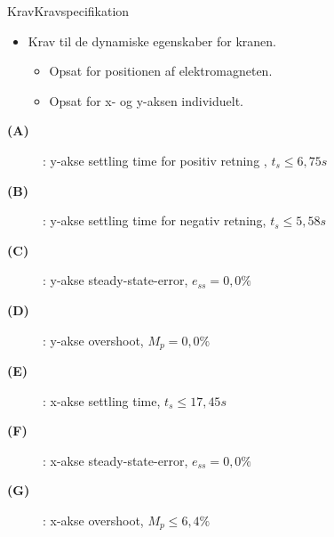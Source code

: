 \begin{frame}{Krav}{Kravspecifikation}


 \begin{minipage}[H]{0.8\linewidth}
  \begin{itemize}
    \item<1-> Krav til de dynamiske egenskaber for kranen.
    \vspace{0.2cm}
        \begin{itemize}
          \item<1-> Opsat for positionen af elektromagneten. 
          \vspace{0.2cm}
          \item<1-> Opsat for x- og y-aksen individuelt.
        \end{itemize}
  \end{itemize}
  \end{minipage}
  \vfill
\begin{description}
    \item[\textbf{(A)}] : y-akse settling time for positiv retning , $t_s \leq 6,75 s$
    \item[\textbf{(B)}] : y-akse settling time for negativ retning, $t_s \leq 5,58 s$
    \item[\textbf{(C)}] : y-akse steady-state-error, $e_{ss} = 0,0\%$
    \item[\textbf{(D)}] : y-akse overshoot, $M_p = 0,0\%$ 
    \item[\textbf{(E)}] : x-akse settling time, $t_s \leq 17,45 s$
    \item[\textbf{(F)}] : x-akse steady-state-error, $e_{ss} = 0,0\%$ 
    \item[\textbf{(G)}] : x-akse overshoot, $M_p \leq 6,4\%$
\end{description}

  \end{frame}
